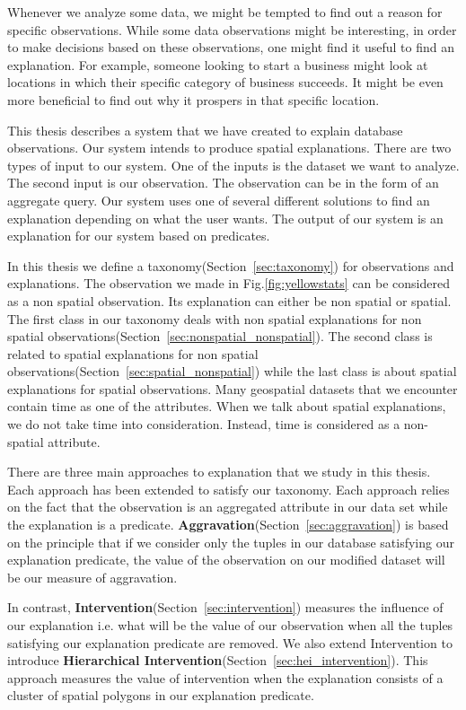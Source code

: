Whenever we analyze some data, we might be tempted to find out a reason for specific observations. While some data observations might be interesting, in order to make decisions based on these observations, one might find it useful to find an explanation. For example, someone looking to start a business might look at locations in which their specific category of business succeeds. It might be even more beneficial to find out why it prospers in that specific location.

This thesis describes a system that we have created to explain database observations. Our system intends to produce spatial explanations. There are two types of input to our system. One of the inputs is the dataset we want to analyze. The second input is our observation. The observation can be in the form of an aggregate query. Our system uses one of several different solutions to find an explanation depending on what the user wants. The output of our system is an explanation for our system based on predicates.

In this thesis we define a taxonomy(Section~\ref{sec:taxonomy}) for observations and explanations.  The observation we made in Fig.\ref{fig:yellowstats} can be considered as a non spatial observation. Its explanation can either be non spatial or spatial. The first class in our taxonomy deals with non spatial explanations for non spatial observations(Section~\ref{sec:nonspatial_nonspatial}). The second class is related to spatial explanations for non spatial observations(Section~\ref{sec:spatial_nonspatial}) while the last class is about spatial explanations for spatial observations. Many geospatial datasets that we encounter contain time as one of the attributes. When we talk about spatial explanations, we do not take time into consideration. Instead, time is considered as a non-spatial attribute.

There are three main approaches to explanation that we study in this thesis. Each approach has been extended to satisfy our taxonomy. Each approach relies on the fact that the observation is an aggregated attribute in our data set while the explanation is a predicate. \textbf{Aggravation}(Section~\ref{sec:aggravation}) is based on the principle that if we consider only the tuples in our database satisfying our explanation predicate, the value of the observation on our modified dataset will be our measure of aggravation\citep{roy2014formal,meliou2014causality}.

In contrast, \textbf{Intervention}(Section~\ref{sec:intervention}) measures the influence of our explanation i.e. what will be the value of our observation when all the tuples satisfying our explanation predicate are removed\citep{roy2014formal}. We also extend Intervention to introduce \textbf{Hierarchical Intervention}(Section~\ref{sec:hei_intervention}). This approach measures the value of intervention when the explanation consists of a cluster of spatial polygons in our explanation predicate.

